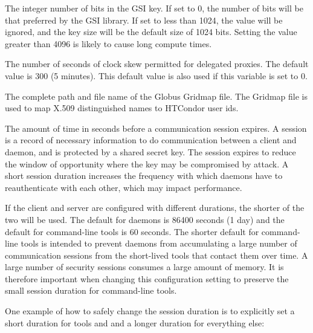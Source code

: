 \begin{description}
\label{param:GSIDelegationKeybits}
\item[\Macro{GSI\_DELEGATION\_KEYBITS}]
  The integer number of bits in the GSI key.
  If set to 0, the number of bits will be that preferred by the GSI library.
  If set to less than 1024, the value will be ignored, and the key size
  will be the default size of 1024 bits.
  Setting the value greater than 4096 is likely to cause long compute times.

\label{param:GSIDelegationClockSkewAllowable}
\item[\Macro{GSI\_DELEGATION\_CLOCK\_SKEW\_ALLOWABLE}]
  The number of seconds of clock skew permitted for delegated proxies.
  The default value is 300 (5 minutes).  This default value is also used
  if this variable is set to 0.
  
\label{param:GridMap}
\item[\Macro{GRIDMAP}]
  The complete path and file name of the Globus Gridmap file.
  The Gridmap file is used to map
  X.509 distinguished names to HTCondor user ids.

\label{param:SecDefaultSessionDuration}
\item[\Macro{SEC\_<access-level>\_SESSION\_DURATION}]
  The amount of time in seconds before
  a communication session expires.
  A session is a record of necessary information to do communication
  between a client and daemon, and is protected by a shared secret key.
  The session expires to reduce the window of opportunity where
  the key may be compromised by attack.  A short session duration
  increases the frequency with which daemons have to reauthenticate
  with each other, which may impact performance.

  If the client and server are configured with different durations,
  the shorter of the two will be used.  The default for daemons is
  86400 seconds (1 day) and the default for command-line tools is 60
  seconds.  The shorter default for command-line tools is intended to
  prevent daemons from accumulating a large number of communication
  sessions from the short-lived tools that contact them over time.  A
  large number of security sessions consumes a large amount of memory.
  It is therefore important when changing this configuration setting
  to preserve the small session duration for command-line tools.

  One example of how to safely change the session duration is to
  explicitly set a short duration for tools and 
  and a longer duration for everything else:


\end{description}
